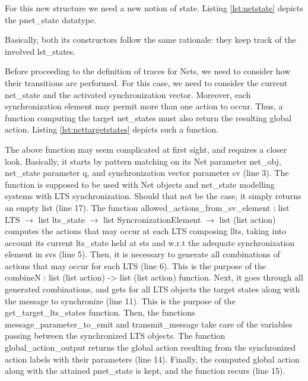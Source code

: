 	For this new structure we need a new notion of state. Listing \ref{lst:netstate} depicts the \textsf{pnet\_state}
	datatype.

		

	\noindent Basically, both its constructors follow the same rationale: they keep track of the 
	involved \textsf{lst\_states}. 
	
	
	Before proceeding to the definition of traces for	\textsf{Net}s, we need to consider
	how their transitions are performed. For this case, we need to consider the current
	\textsf{net\_state} and the activated synchronization vector. Moreover, each synchronization
	element may permit more than one \textsf{action} to occur. Thus, a function
	computing the target \textsf{net\_state}s must also return the resulting global action.
	Listing \ref{lst:nettargetstates} depicts such a function.
		
			
	
	
	\noindent The above function may seem complicated at first sight, and requires 
	a closer look. Basically, it starts by pattern matching on its \textsf{Net} parameter
	\textsf{net\_obj}, \textsf{net\_state} parameter \textsf{q}, and synchronization vector parameter
	\textsf{sv} (line 3). The function is supposed to be used with \textsf{Net} objects and \textsf{net\_state}
	modelling systems with \textsf{LTS} synchronization. Should that not be the case, it simply returns
	an empty list (line 17). The function 
	\textsf{allowed\_actions\_from\_sv\_element : list LTS $\rightarrow$ list lts_state $\rightarrow$ 
	list SyncronizationElement $\rightarrow$ list (list action)} computes the \textsf{actions} that
	may occur at each \textsf{LTS} composing \textsf{llts}, taking into account its current
	\textsf{lts\_state} held at \textsf{sts} and w.r.t the adequate synchronization element
	in \textsf{svs} (line 5). Then, it is necessary to generate all combinations of \textsf{actions}
	that may occur for each \textsf{LTS} (line 6). This is the purpose of the
	\textsf{combineN : list (list action) -> list (list action)} function.  Next, it goes through 
	all generated combinations, and gets for all \textsf{LTS} objects
	the target states along with the message to synchronize (line 11). 
	This is the purpose of the \textsf{get\_target\_lts\_states}
	function. Then,  the functions \textsf{message\_parameter\_to\_emit} and
	\textsf{transmit\_message} take care of the variables passing between
	the synchronized \textsf{LTS} objects. The function 
	\textsf{global\_action\_output} returns the global action
	resulting from the synchronized \textsf{action} labels with their parameters (line 14).
	Finally, the computed global action along with the attained \textsf{pnet\_state} is kept,	
	and the function recurs (line 15). 
	 
